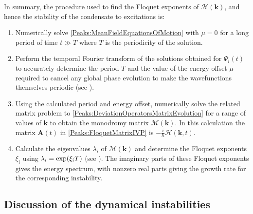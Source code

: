 \parasep

In summary, the procedure used to find the Floquet exponents of $\mathcal{H}(\bm{k})$, and hence the stability of the condensate to excitations is:
\begin{enumerate}
    \item Numerically solve \eqref{Peaks:MeanFieldEquationsOfMotion} with $\mu=0$ for a long period of time $t \gg T$ where $T$ is the periodicity of the solution.
    \item Perform the temporal Fourier transform of the solutions obtained for $\Psi_i(t)$ to accurately determine the period $T$ and the value of the energy offset $\mu$ required to cancel any global phase evolution to make the wavefunctions themselves periodic (see ).
    \item Using the calculated period and energy offset, numerically solve the related matrix problem to \eqref{Peaks:DeviationOperatorsMatrixEvolution} for a range of values of $\bm{k}$ to obtain the monodromy matrix $\mathcal{M}(\bm{k})$. In this calculation the matrix $\bm{A}(t)$ in \eqref{Peaks:FloquetMatrixIVP} is $\displaystyle -\frac{i}{\hbar}\mathcal{H}(\bm{k}, t)$.
    \item Calculate the eigenvalues $\lambda_i$ of $\mathcal{M}(\bm{k})$ and determine the Floquet exponents $\xi_i$ using $\protect{\lambda_i = \exp(\xi_i T)}$ (see ). The imaginary parts of these Floquet exponents gives the energy spectrum, with nonzero real parts giving the growth rate for the corresponding instability.
\end{enumerate}

\subsection{Discussion of the dynamical instabilities}

